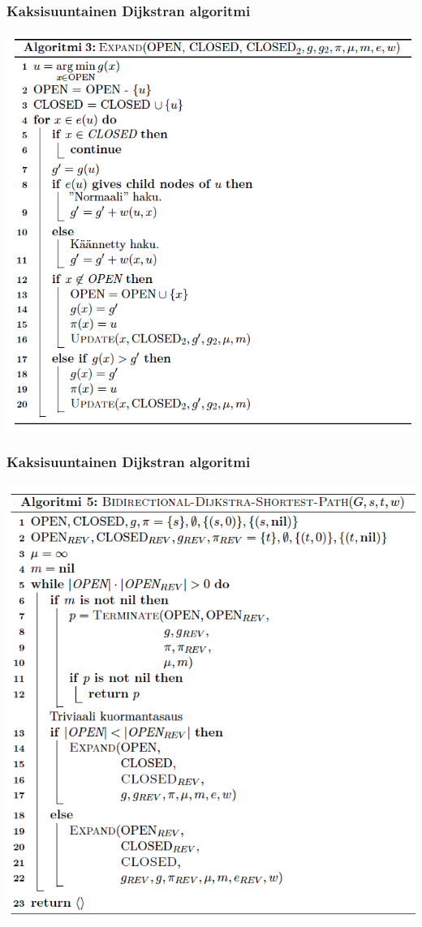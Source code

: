 \documentclass{beamer}
\begin{document}
\begin{frame}
  \frametitle{Kaksisuuntainen Dijkstran algoritmi}
  \includegraphics[width=\textwidth,height=\textheight,keepaspectratio]{expand}
\end{frame}

\begin{frame}
  \frametitle{Kaksisuuntainen Dijkstran algoritmi}
  \includegraphics[width=\textwidth,height=\textheight,keepaspectratio]{bidijkstra}
\end{frame}
\end{document}
